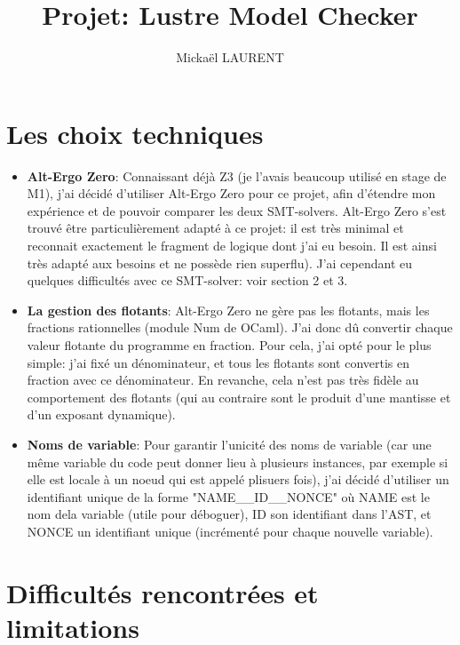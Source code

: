\documentclass[a4paper]{article}%
\title{\vspace{1.5cm}Projet: Lustre Model Checker}
\author{Mickaël LAURENT}
\date{\vspace{-5ex}}
\begin{document}
    \maketitle

    \section{Les choix techniques}
		
	\begin{itemize}
		\item \textbf{Alt-Ergo Zero}: Connaissant déjà Z3 (je l'avais beaucoup utilisé en stage de M1), j'ai décidé d'utiliser Alt-Ergo Zero pour ce projet,
		afin d'étendre mon expérience et de pouvoir comparer les deux SMT-solvers. Alt-Ergo Zero s'est trouvé être particulièrement adapté à ce projet:
		il est très minimal et reconnait exactement le fragment de logique dont j'ai eu besoin. Il est ainsi très adapté aux besoins et ne possède rien superflu).
		J'ai cependant eu quelques difficultés avec ce SMT-solver: voir section 2 et 3.\\
		\item \textbf{La gestion des flotants}: Alt-Ergo Zero ne gère pas les flotants, mais les fractions rationnelles (module Num de OCaml).
		J'ai donc dû convertir chaque valeur flotante du programme en fraction. Pour cela, j'ai opté pour le plus simple: j'ai fixé un dénominateur,
		et tous les flotants sont convertis en fraction avec ce dénominateur.
		En revanche, cela n'est pas très fidèle au comportement des flotants (qui au contraire sont le produit d'une mantisse et d'un exposant dynamique).\\
		\item \textbf{Noms de variable}: Pour garantir l'unicité des noms de variable (car une même variable du code peut donner lieu à plusieurs instances,
		par exemple si elle est locale à un noeud qui est appelé plisuers fois), j'ai décidé d'utiliser un identifiant unique de la forme "NAME\_\_ID\_\_NONCE"
		où NAME est le nom dela variable (utile pour déboguer), ID son identifiant dans l'AST, et NONCE un identifiant unique (incrémenté pour chaque nouvelle variable).
	\end{itemize}

	\section{Difficultés rencontrées et limitations}
\end{document}
